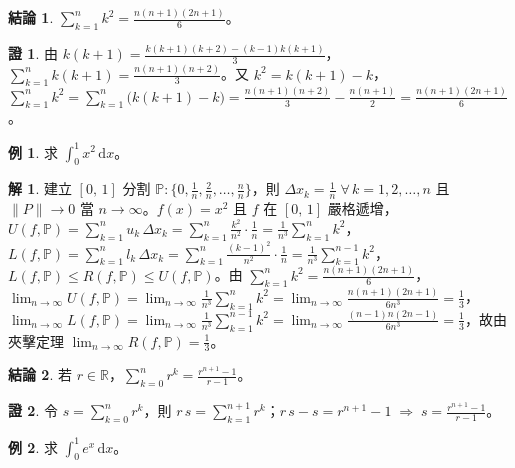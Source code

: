 \documentclass[12pt]{extarticle}
\newcommand{\ds}{\displaystyle}
\newcommand{\ie}{\;\Longrightarrow\;}
\theoremstyle{definition}
\newtheorem*{fact}{結論}
\newtheorem*{ex}{例}
\newtheorem*{sol}{解}
\newtheorem*{prf}{證}
\begin{document}
\begin{fact}
  $\ds\sum_{k = 1}^n k^2 = \frac{n(n + 1)(2n + 1)}{6}$。
\end{fact}

\begin{prf}
  由 $\ds k(k + 1) = \frac{k(k + 1)(k + 2) - (k - 1)k(k + 1)}{3}$，$\ds\sum_{k = 1}^n k(k + 1) = \frac{n(n+1)(n+2)}{3}$。又 $\ds k^2 = k(k + 1) - k$，$\ds\sum_{k = 1}^n k^2 = \sum_{k = 1}^n \big(k(k + 1) - k\big) = \frac{n(n + 1)(n + 2)}{3} - \frac{n(n + 1)}{2} = \frac{n(n + 1)(2n + 1)}{6}$。 
\end{prf}

\begin{ex}
  求 $\ds\int_0^1 x^2\,\text{d}x$。
\end{ex}

\begin{sol}
  建立 $\ds [0,\,1]$ 分割 $\ds\mathbb{P}: \Big\{0, \frac{1}{n}, \frac{2}{n}, \ldots, \frac{n}{n}\Big\}$，則 $\ds\Delta x_k = \frac{1}{n}\;\forall\,k=1,2,\ldots,n$ 且 $\ds\|P\|\to 0$ 當 $n\to\infty$。$f(x) = x^2$ 且 $f$ 在 $[0,\,1]$ 嚴格遞增，$\ds U(f,\mathbb{P}) = \sum_{k=1}^n u_k\,\Delta x_k = \sum_{k=1}^n\frac{k^2}{n^2}\cdot\frac{1}{n} = \frac{1}{n^3}\sum_{k = 1}^n k^2$，$\ds L(f,\mathbb{P}) = \sum_{k=1}^n l_k\,\Delta x_k = \sum_{k=1}^n\frac{(k - 1)^2}{n^2}\cdot\frac{1}{n} = \frac{1}{n^3}\sum_{k = 1}^{n-1}k^2$，$\ds L(f,\mathbb{P})\leqslant R(f,\mathbb{P})\leqslant U(f, \mathbb{P})$。由 $\ds\sum_{k = 1}^n k^2 = \frac{n(n + 1)(2n + 1)}{6}$，$\ds\lim_{n\to\infty} U(f,\mathbb{P}) = \lim_{n\to\infty}\frac{1}{n^3}\sum_{k = 1}^n k^2 = \lim_{n\to\infty}\frac{n(n + 1)(2 n + 1)}{6n^3} = \frac{1}{3}$，$\ds\lim_{n\to\infty} L(f,\mathbb{P}) = \lim_{n\to\infty}\frac{1}{n^3}\sum_{k = 1}^{n - 1} k^2 = \lim_{n\to\infty}\frac{(n - 1)n(2 n - 1)}{6n^3} = \frac{1}{3}$，故由夾擊定理 $\ds\lim_{n\to\infty} R(f,\mathbb{P}) = \frac{1}{3}$。
\end{sol}

\begin{fact}
  若 $r\in\mathbb{R}$，$\ds\sum_{k = 0}^n r^k = \frac{r^{n+1} - 1}{r - 1}$。
\end{fact}

\begin{prf}
  令 $\ds s = \sum_{k = 0}^n r^k$，則 $\ds r\,s = \sum_{k = 1}^{n + 1} r^k$；$\ds r\,s - s = r^{n + 1} - 1\ie s = \frac{r^{n + 1} - 1}{r - 1}$。 
\end{prf}

\begin{ex}
  求 $\ds\int_0^1 e^x\,\text{d}x$。
\end{ex}
\end{document}
